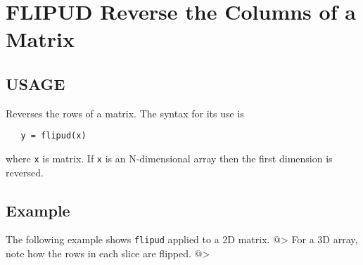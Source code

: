 \section{FLIPUD Reverse the Columns of a Matrix}

\subsection{USAGE}

Reverses the rows of a matrix.  The syntax for its use is
\begin{verbatim}
   y = flipud(x)
\end{verbatim}
where \verb|x| is matrix.  If \verb|x| is an N-dimensional array then
the first dimension is reversed.
\subsection{Example}

The following example shows \verb|flipud| applied to a 2D matrix.
@>
For a 3D array, note how the rows in each slice are flipped.
@>
